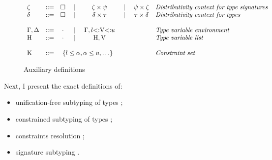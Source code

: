 
\begin{figure}
\footnotesize
\[
\begin{array}{lccccccl}
    \dctxtysig &::=& \square &
        \Alt& \typair{\dctxtysig}{\tysig} &
        \Alt& \typair{\tysig}{\dctxtysig} &
        \textit{Distributivity context for type signatures}
    \\
    \dctxty &::=& \square &
        \Alt& \typair{\dctxty}{\ty} &
        \Alt& \typair{\ty}{\dctxty} &
        \textit{Distributivity context for types}
    \\
    \\
    \AEnv, \UEnv &::=& \EmptyEnv &
        \Alt& \AEnv, \varbound{\vany}{\tylb}{\tyub} &
        & & 
        \textit{Type variable environment}
    \\
    \UEnvD &::=& \EmptyEnv &
        \Alt& \UEnvD, \vany &
        & & 
        \textit{Type variable list}
    \\
    \\
    \CSet &::=& \multicolumn{3}{c}{
            \ctrset{\ctrsub{\tylb}{\va}, \ctrsub{\va}{\tyub}, \ldots}
        } & & &
        \textit{Constraint set}
\end{array}
\]
\caption{Auxiliary definitions}\label{fig:subty-aux}
\end{figure}


Next, I present the exact definitions of:
\begin{itemize}
    \item unification-free subtyping of types ;
    \item constrained subtyping of types ;
    \item constraints resolution \solvectrdflt;
    \item signature subtyping .
\end{itemize}

